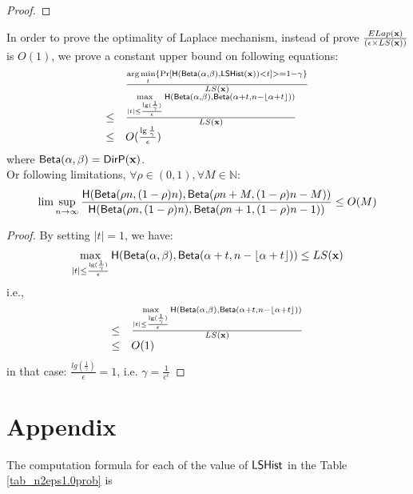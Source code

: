 \documentclass{article}
\begin{document}
{\begin{proof}
\end{proof}
\begin{thm}
In order to prove the optimality of Laplace mechanism, instead of prove
$\frac{ELap(\textbf{x})}{(\epsilon \times LS(\textbf{x}))}$ is $O(1)$, we prove a constant upper bound on following equations:
\[
\begin{array}{ll}
	 &	\frac{\arg\min\limits_{t}\{\Pr[\mathsf{H}(\mathsf{Beta}(\alpha, \beta), \mathsf{LSHist}(\textbf{x}))< t] >= 1 - \gamma\}}
	 	{	LS(\textbf{x})	}\\
\leq &	\frac{\max\limits_{|t| \leq \frac{\lg(\frac{1}{\gamma})}{\epsilon}}
		\mathsf{H}(\mathsf{Beta}(\alpha, \beta), \mathsf{Beta}(\alpha + t, n - \lfloor \alpha + t \rfloor))}
		{	LS(\textbf{x})	}\\
\leq & 	O(\frac{\lg{\frac{1}{\gamma}}}{\epsilon})
\end{array}
\]
where $\mathsf{Beta}(\alpha, \beta) = \mathsf{DirP}(\textbf{x}) $.\\
Or following limitations, $\forall \rho \in (0,1), \forall M \in \mathbb{N}$:
\[
\lim\sup\limits_{n \rightarrow \infty} \frac{\mathsf{H}(\mathsf{Beta}(\rho n, (1 - \rho) n), \mathsf{Beta}(\rho n + M, (1 - \rho) n - M))}{\mathsf{H}(\mathsf{Beta}(\rho n, (1 - \rho) n), \mathsf{Beta}(\rho n + 1, (1 - \rho) n - 1))}
\leq O(M)
\]
\end{thm}

\begin{proof}
By setting $|t| = 1$, we have: 
\[
\max\limits_{|t| \leq \frac{\lg(\frac{1}{\gamma})}{\epsilon}}
		\mathsf{H}(\mathsf{Beta}(\alpha, \beta), \mathsf{Beta}(\alpha + t, n - \lfloor \alpha + t \rfloor)) \leq LS(\textbf{x})
\]
i.e.,
\[
\begin{array}{ll}
\leq &	\frac{\max\limits_{|t| \leq \frac{\lg(\frac{1}{\gamma})}{\epsilon}}
		\mathsf{H}(\mathsf{Beta}(\alpha, \beta), \mathsf{Beta}(\alpha + t, n - \lfloor \alpha + t \rfloor))}
		{	LS(\textbf{x})	}\\
\leq & 	O(1)
\end{array}
\] 
in that case:
$\frac{lg(\frac{1}{\gamma})}{\epsilon} = 1$, i.e. $\gamma = \frac{1}{e^{\epsilon}}$
\end{proof}

\clearpage

\section*{Appendix}
The computation formula for each of the value of $\mathsf{LSHist}$ in the Table \ref{tab_n2eps1.0prob} is

}
\end{document}
